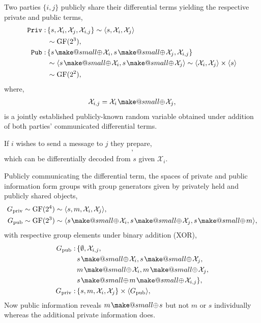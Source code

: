 \documentclass[twocolumn, aps, amsmath, amssymb, nofootinbib, superscriptaddress, longbibliography, doublefloatfix, table-of-contents, eqsecnum, rmp]{revtex4-2}
\makeatletter
\newcommand{\soplus}{{{\hspace{1pt}}{\mathbin{\mathpalette\make@small{\mathbin\oplus}}}}{\hspace{1pt}}}
\newcommand{\make@small}[2]{%
  \vcenter{\hbox{%
    \scalebox{0.6}{$\m@th#1#2$}%
  }}%
}
\makeatother
\begin{document}
Two parties $\{i,j\}$ publicly share their differential terms yielding the respective private and public terms,
\begin{align}
	\mathtt{Priv}:\, &\{s,\mathcal{X}_i,\mathcal{X}_j,\mathcal{X}_{i,j}\} \sim \langle s,\mathcal{X}_i,\mathcal{X}_j \rangle\nonumber\\
	&\sim \mathrm{GF}(2^3),\nonumber\\
	\mathtt{Pub}:\, &\{s\soplus \mathcal{X}_i, s\soplus \mathcal{X}_j, \mathcal{X}_{i,j} \}\nonumber\\
	&\sim \langle s\soplus \mathcal{X}_i,s\soplus \mathcal{X}_j \rangle \sim \langle \mathcal{X}_i,\mathcal{X}_j \rangle \times \langle s\rangle \nonumber\\
	&\sim \mathrm{GF}(2^2),
\end{align}
where,
\begin{align}
	\mathcal{X}_{i,j} = \mathcal{X}_i\soplus\mathcal{X}_j,
\end{align}
is a jointly established publicly-known random variable obtained under addition of both parties' communicated differential terms.

If $i$ wishes to send a message to $j$ they prepare,
\begin{align}
	[s, s\soplus m \soplus \mathcal{X}_i],
\end{align}
which can be differentially decoded from $s$ given $\mathcal{X}_i$.

Publicly communicating the differential term, the spaces of private and public information form groups with group generators given by privately held and publicly shared objects,
\begin{align}
	G_\mathrm{priv} &\sim \mathrm{GF}(2^4) \sim \langle s,m,\mathcal{X}_i,\mathcal{X}_j \rangle, \nonumber\\
	G_\mathrm{pub} &\sim \mathrm{GF}(2^3) \sim \langle s\soplus \mathcal{X}_i, s\soplus \mathcal{X}_j, s\soplus m\rangle,
\end{align}
with respective group elements under binary addition (XOR),
\begin{align}
	G_\mathrm{pub}:\, &\{\emptyset, \mathcal{X}_{i,j},\nonumber\\
	&s\soplus \mathcal{X}_i, s\soplus \mathcal{X}_j,\nonumber\\
	 &m\soplus \mathcal{X}_i, m\soplus\mathcal{X}_j,\nonumber\\
	 &s\soplus m\soplus \mathcal{X}_{i,j}\},\nonumber\\
	G_\mathrm{priv}:\, &\{s,m,\mathcal{X}_i,\mathcal{X}_j\} \times \langle G_\mathrm{pub} \rangle,
\end{align}
Now public information reveals $m\soplus s$ but not $m$ or $s$ individually whereas the additional private information does.
\end{document}
